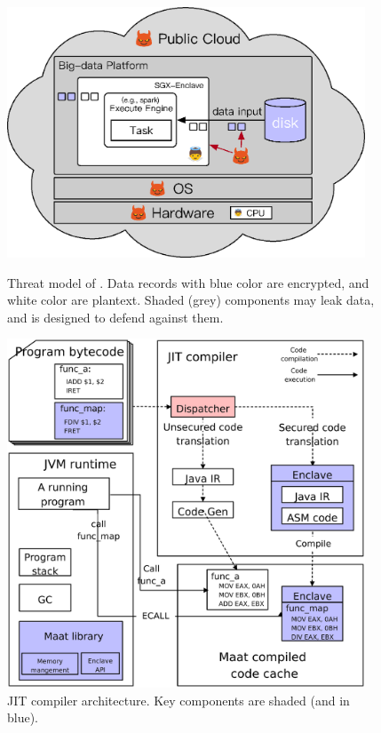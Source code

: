 \begin{figure}[h]
    \centering
    \begin{minipage}{.4\textwidth}    
          \vspace{-.1in}
        \includegraphics[width=0.95\textwidth]{figures/threat_public.ps}
        \caption{Threat model of \maat. Data records with blue color are 
encrypted, and white color are plantext. Shaded (grey) components may leak 
data, and \maat is designed to defend against them.}
        \label{fig:maat-threat}
    \end{minipage}
    \hspace{.2in} 
    \centering
    \begin{minipage}{0.4\textwidth}
         \vspace{-.1in}
        \includegraphics[width=0.95\textwidth]{figures/jit_arch.ps}
         \vspace{-.1in}
        \caption{\maat JIT compiler architecture. Key components are 
shaded (and in blue).}
        \label{fig:maat-arch}
    \end{minipage}
\end{figure}

